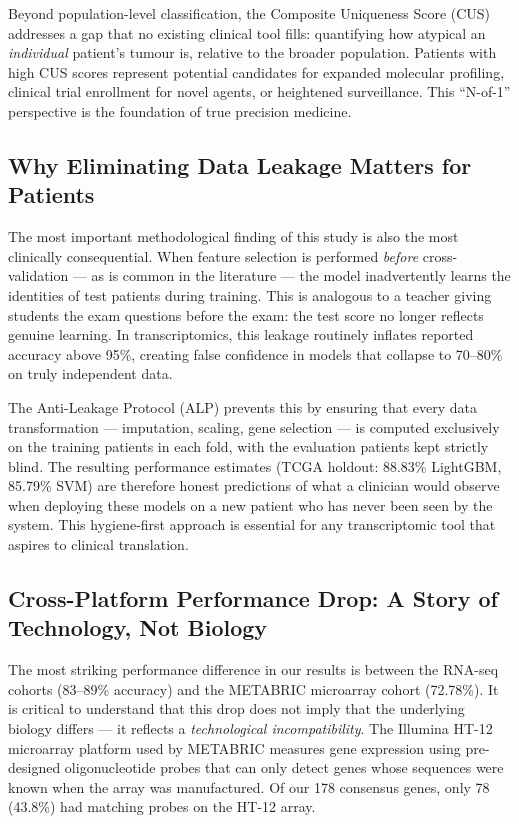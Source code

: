 \documentclass[10pt,a4paper,twocolumn]{article}
\begin{document}
Beyond population-level classification, the Composite Uniqueness Score (CUS) addresses a gap that no existing clinical tool fills: quantifying how atypical an \textit{individual} patient's tumour is, relative to the broader population. Patients with high CUS scores represent potential candidates for expanded molecular profiling, clinical trial enrollment for novel agents, or heightened surveillance. This ``N-of-1'' perspective is the foundation of true precision medicine.

\subsection{Why Eliminating Data Leakage Matters for Patients}

The most important methodological finding of this study is also the most clinically consequential. When feature selection is performed \textit{before} cross-validation --- as is common in the literature --- the model inadvertently learns the identities of test patients during training. This is analogous to a teacher giving students the exam questions before the exam: the test score no longer reflects genuine learning. In transcriptomics, this leakage routinely inflates reported accuracy above 95\%, creating false confidence in models that collapse to 70--80\% on truly independent data.

The Anti-Leakage Protocol (ALP) prevents this by ensuring that every data transformation --- imputation, scaling, gene selection --- is computed exclusively on the training patients in each fold, with the evaluation patients kept strictly blind. The resulting performance estimates (TCGA holdout: 88.83\% LightGBM, 85.79\% SVM) are therefore honest predictions of what a clinician would observe when deploying these models on a new patient who has never been seen by the system. This hygiene-first approach is essential for any transcriptomic tool that aspires to clinical translation.

\subsection{Cross-Platform Performance Drop: A Story of Technology, Not Biology}

The most striking performance difference in our results is between the RNA-seq cohorts (83--89\% accuracy) and the METABRIC microarray cohort (72.78\%). It is critical to understand that this drop does not imply that the underlying biology differs --- it reflects a \textit{technological incompatibility}. The Illumina HT-12 microarray platform used by METABRIC measures gene expression using pre-designed oligonucleotide probes that can only detect genes whose sequences were known when the array was manufactured. Of our 178 consensus genes, only 78 (43.8\%) had matching probes on the HT-12 array.
\end{document}
